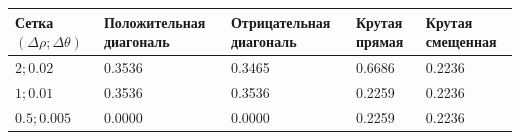 \begin{tabular}{|l|l|l|l|l|}
\hline
Сетка $(\Delta\rho;\Delta\theta)$ & Положительная диагональ & Отрицательная диагональ & Крутая прямая & Крутая смещенная \\
\hline
$2; 0.02$ & 0.3536 & 0.3465 & 0.6686 & 0.2236 \\
\hline
$1; 0.01$ & 0.3536 & 0.3536 & 0.2259 & 0.2236 \\
\hline
$0.5; 0.005$ & 0.0000 & 0.0000 & 0.2259 & 0.2236 \\
\hline
\end{tabular}
